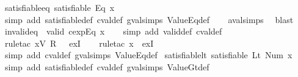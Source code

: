 \begin{isabellebody}
\endisatagproof
{\isafoldproof}%
%
\isadelimproof
\isanewline
%
\endisadelimproof
\isanewline
{}\isamarkupfalse%
\ satisfiable{\isacharunderscore}eq{\isacharcolon}\ {\isachardoublequoteopen}satisfiable\ {\isacharparenleft}Eq\ x{\isacharparenright}{\isachardoublequoteclose}\isanewline
%
\isadelimproof
\ \ %
\endisadelimproof
%
\isatagproof
{}\isamarkupfalse%
\ {\isacharparenleft}simp\ add{\isacharcolon}\ satisfiable{\isacharunderscore}def\ cval{\isacharunderscore}def\ gval{\isachardot}simps\ ValueEq{\isacharunderscore}def{\isacharparenright}\isanewline
\ \ \isamarkupfalse%
\ aval{\isachardot}simps{\isacharparenleft}{}{\isacharparenright}\ \isamarkupfalse%
\ blast%
\endisatagproof
{\isafoldproof}%
%
\isadelimproof
\isanewline
%
\endisadelimproof
\isanewline
{}\isamarkupfalse%
\ invalid{\isacharunderscore}eq{\isacharcolon}\ {\isachardoublequoteopen}{\isasymnot}\ valid\ {\isacharparenleft}cexp{\isachardot}Eq\ x{\isacharparenright}{\isachardoublequoteclose}\isanewline
%
\isadelimproof
\ \ %
\endisadelimproof
%
\isatagproof
{}\isamarkupfalse%
\ {\isacharparenleft}simp\ add{\isacharcolon}\ valid{\isacharunderscore}def\ cval{\isacharunderscore}def{\isacharparenright}\isanewline
\ \ \isamarkupfalse%
\ {\isacharparenleft}rule{\isacharunderscore}tac\ x{\isacharequal}{\isachardoublequoteopen}V\ {\isacharparenleft}R\ {}{\isacharparenright}{\isachardoublequoteclose}\ \ exI{\isacharparenright}\isanewline
\ \ \isamarkupfalse%
\ {\isacharparenleft}rule{\isacharunderscore}tac\ x{\isacharequal}{\isachardoublequoteopen}{\isacharless}{\isachargreater}{\isachardoublequoteclose}\ \ exI{\isacharparenright}\isanewline
\ \ \isamarkupfalse%
\ {\isacharparenleft}simp\ add{\isacharcolon}\ cval{\isacharunderscore}def\ gval{\isachardot}simps\ ValueEq{\isacharunderscore}def{\isacharparenright}%
\endisatagproof
{\isafoldproof}%
%
\isadelimproof
\isanewline
%
\endisadelimproof
\isanewline
{}\isamarkupfalse%
\ satisfiable{\isacharunderscore}lt{\isacharcolon}\ {\isachardoublequoteopen}satisfiable\ {\isacharparenleft}Lt\ {\isacharparenleft}Num\ x{\isacharparenright}{\isacharparenright}{\isachardoublequoteclose}\isanewline
%
\isadelimproof
\ \ %
\endisadelimproof
%
\isatagproof
{}\isamarkupfalse%
\ {\isacharparenleft}simp\ add{\isacharcolon}\ satisfiable{\isacharunderscore}def\ cval{\isacharunderscore}def\ gval{\isachardot}simps\ ValueGt{\isacharunderscore}def{\isacharparenright}\isanewline

\end{isabellebody}
